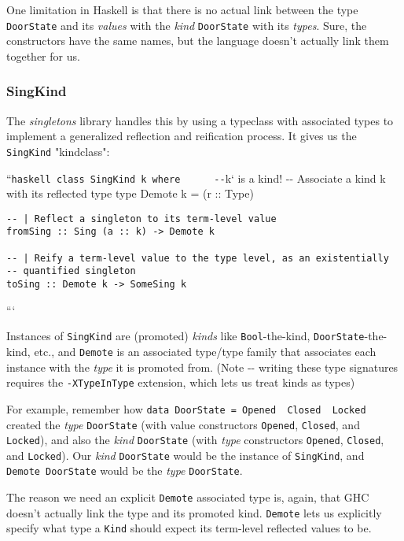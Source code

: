 \documentclass[]{article}
\begin{document}
One limitation in Haskell is that there is no actual link between the type
\texttt{DoorState} and its \emph{values} with the \emph{kind} \texttt{DoorState}
with its \emph{types}. Sure, the constructors have the same names, but the
language doesn't actually link them together for us.

\subsubsection{SingKind}

The \emph{singletons} library handles this by using a typeclass with associated
types to implement a generalized reflection and reification process. It gives us
the \texttt{SingKind} "kindclass":

``\texttt{haskell\ class\ SingKind\ k\ where\ \ \ \ \ \ -\/-}k` is a kind! -\/-
\textbar{} Associate a kind k with its reflected type type Demote k = (r ::
Type)

\begin{verbatim}
-- | Reflect a singleton to its term-level value
fromSing :: Sing (a :: k) -> Demote k

-- | Reify a term-level value to the type level, as an existentially
-- quantified singleton
toSing :: Demote k -> SomeSing k
\end{verbatim}

```

Instances of \texttt{SingKind} are (promoted) \emph{kinds} like
\texttt{Bool}-the-kind, \texttt{DoorState}-the-kind, etc., and \texttt{Demote}
is an associated type/type family that associates each instance with the
\emph{type} it is promoted from. (Note -\/- writing these type signatures
requires the \texttt{-XTypeInType} extension, which lets us treat kinds as
types)

For example, remember how
\texttt{data\ DoorState\ =\ Opened\ \textbar{}\ Closed\ \textbar{}\ Locked}
created the \emph{type} \texttt{DoorState} (with value constructors
\texttt{Opened}, \texttt{Closed}, and \texttt{Locked}), and also the \emph{kind}
\texttt{DoorState} (with \emph{type} constructors
\texttt{\textquotesingle{}Opened}, \texttt{\textquotesingle{}Closed}, and
\texttt{\textquotesingle{}Locked}). Our \emph{kind} \texttt{DoorState} would be
the instance of \texttt{SingKind}, and \texttt{Demote\ DoorState} would be the
\emph{type} \texttt{DoorState}.

The reason we need an explicit \texttt{Demote} associated type is, again, that
GHC doesn't actually link the type and its promoted kind. \texttt{Demote} lets
us explicitly specify what type a \texttt{Kind} should expect its term-level
reflected values to be.
\end{document}
